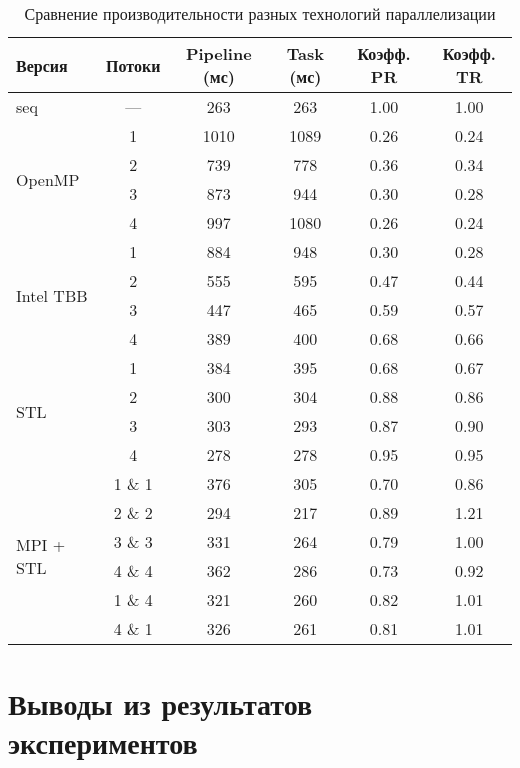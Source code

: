 \documentclass[12pt]{article}
\begin{document}
\begin{table}[H]
\centering
\begin{tabular}{|l|c|c|c|c|c|}
\hline
\textbf{Версия} & \textbf{Потоки} & \textbf{Pipeline (мс)} & \textbf{Task (мс)} & \textbf{Коэфф. PR} & \textbf{Коэфф. TR} \\
\hline
seq & —    & 263 & 263 & 1.00 & 1.00 \\
\hline
\multirow{4}{*}{OpenMP} 
    & 1    & 1010 & 1089 & 0.26 & 0.24 \\
    & 2    & 739  & 778  & 0.36 & 0.34 \\
    & 3    & 873  & 944  & 0.30 & 0.28 \\
    & 4    & 997  & 1080 & 0.26 & 0.24 \\
\hline
\multirow{4}{*}{Intel TBB} 
    & 1    & 884  & 948  & 0.30 & 0.28 \\
    & 2    & 555  & 595  & 0.47 & 0.44 \\
    & 3    & 447  & 465  & 0.59 & 0.57 \\
    & 4    & 389  & 400  & 0.68 & 0.66 \\
\hline
\multirow{4}{*}{STL} 
    & 1    & 384  & 395  & 0.68 & 0.67 \\
    & 2    & 300  & 304  & 0.88 & 0.86 \\
    & 3    & 303  & 293  & 0.87 & 0.90 \\
    & 4    & 278  & 278  & 0.95 & 0.95 \\
\hline
\multirow{6}{*}{MPI + STL} 
    & 1 \& 1 & 376  & 305  & 0.70 & 0.86 \\
    & 2 \& 2& 294  & 217  & 0.89 & 1.21 \\
    & 3 \& 3& 331  & 264  & 0.79 & 1.00 \\
    & 4 \& 4& 362  & 286  & 0.73 & 0.92 \\
    & 1 \& 4& 321  & 260  & 0.82 & 1.01 \\
    & 4 \& 1& 326  & 261  & 0.81 & 1.01 \\
\hline
\end{tabular}
\caption{Сравнение производительности разных технологий параллелизации}
\label{tab:parallel_perf}
\end{table}

\newpage

\section{Выводы из результатов экспериментов}
\end{document}
